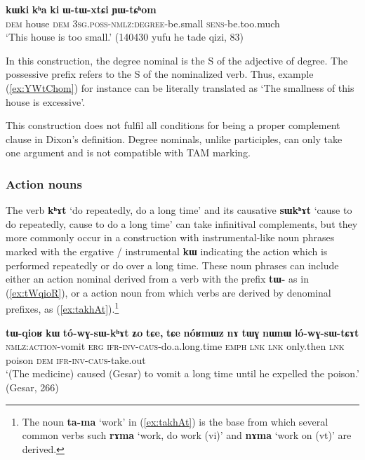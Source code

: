 \documentclass[oneside,a4paper,11pt]{article}
\newcommand{\ipa}[1]{\textbf{\phon#1}} %
\newcommand{\jpg}[2]{\ipa{#1} `#2'} %
\newcommand{\refb}[1]{(\ref{#1})}
\begin{document}
\begin{exe}
\ex \label{ex:YWtChom}
\gll
\ipa{kɯki} 	\ipa{kʰa} 	\ipa{ki} 	\ipa{ɯ-tɯ-xtɕi} 	\ipa{ɲɯ-tɕʰom} \\
\textsc{dem} house \textsc{dem} \textsc{3sg.poss-nmlz:degree}-be.small \textsc{sens}-be.too.much \\
\glt `This house is too small.' (140430 yufu he tade qizi, 83)
\end{exe}

In this construction, the degree nominal is the S of the adjective of degree. The possessive prefix refers to the S of the nominalized verb. Thus, example (\ref{ex:YWtChom}) for instance can be literally translated as `The smallness of this house is excessive'. 

This construction does not fulfil all conditions for being a proper complement clause in Dixon's definition. Degree nominals, unlike participles, can only take one argument and is not compatible with TAM marking.

  \subsubsection{Action nouns}  \label{sec:nouns}
 The verb \jpg{kʰɤt}{do repeatedly, do a long time} and its causative  \jpg{sɯkʰɤt}{cause to do repeatedly, cause to do a long time} can take infinitival complements, but they more commonly occur in a construction with instrumental-like noun phrases marked with the ergative / instrumental \ipa{kɯ} indicating the action which is performed repeatedly or do over a long time. These noun phrases can include either an action nominal derived from a verb with the prefix \ipa{tɯ-} as in \refb{ex:tWqioR}, or a action noun from which verbs are derived by denominal prefixes, as \refb{ex:takhAt}.\footnote{The noun \jpg{ta-ma}{work} in \refb{ex:takhAt} is the base from which several common verbs such \jpg{rɤma}{work, do work (vi)} and \jpg{nɤma}{work on (vt)} are derived.  }
 
  \begin{exe}
\ex \label{ex:tWqioR}
\gll \ipa{tɯ-qioʁ}	\ipa{kɯ}	\ipa{tó-wɣ-sɯ-kʰɤt}	\ipa{ʑo}	\ipa{tɕe,}	\ipa{tɕe}	\ipa{nóʁmɯz}	\ipa{nɤ}	\ipa{tɯɣ}	\ipa{nɯnɯ}	\ipa{ló-wɣ-sɯ-tɕɤt} \\
\textsc{nmlz:action}-vomit \textsc{erg} \textsc{ifr-inv-caus}-do.a.long.time \textsc{emph} \textsc{lnk} \textsc{lnk} only.then \textsc{lnk} poison \textsc{dem} \textsc{ifr-inv-caus}-take.out \\
\glt `(The medicine) caused (Gesar) to vomit a long time until he expelled the poison.' (Gesar, 266)
\end{exe}
\end{document}
